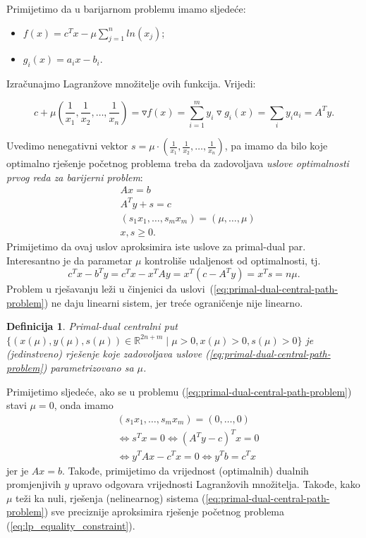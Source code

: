 \documentclass[a4paper, utf8, 11pt, colorlinks]{book}
\newtheorem{definition}{Definicija}
\begin{document}
Primijetimo da u barijarnom problemu imamo sljedeće:
\begin{itemize}
	\item $f(x) =   c^T x - \mu \sum_{j=1}^n ln(x_j) $;
	\item $g_i(x) = a_i x - b_i$.
\end{itemize}
Izračunajmo Lagranžove množitelje ovih funkcija. Vrijedi:

$$c + \mu \left(\frac{1}{x_1}, \frac{1}{x_2}, \ldots, \frac{1}{x_n} \right) = \triangledown f (x) =\sum_{i=1}^m y_i \triangledown g_i(x) = \sum_{i} y_i a_i = A^T y.$$ 

Uvedimo nenegativni vektor $s =\mu \cdot \left(\frac{1}{x_1}, \frac{1}{x_2}, \ldots, \frac{1}{x_n}\right)$, pa imamo da bilo koje optimalno rješenje početnog problema treba da zadovoljava \emph{uslove optimalnosti prvog reda za barijerni problem}:
\begin{align}
	&A x = b \nonumber \\
	&A^T y + s = c  \nonumber \\
	& (s_1 x_1, \ldots, s_m x_m) = (\mu, \ldots, \mu) \label{eq:primal-dual-central-path-problem} \\
	& x, s \geq 0. \nonumber
\end{align}
Primijetimo da ovaj uslov aproksimira iste uslove za primal-dual par.  
Interesantno je da parametar $\mu$ kontroliše udaljenost od optimalnosti, tj. 
$$ c^T x - b^T y = c^T x - x^T A y = x^T(c- A^Ty ) = x^T s = n \mu.$$
 Problem u rješavanju leži u činjenici da uslovi~(\ref{eq:primal-dual-central-path-problem}) ne daju linearni sistem, jer treće ograničenje  nije linearno.

\begin{definition}
	Primal-dual centralni put $\{(x(\mu), y(\mu), s(\mu)) \in \mathbb{R}^{2n + m} \mid \mu > 0, x(\mu) >0, s(\mu)>0 \}$ je (jedinstveno) rješenje koje zadovoljava uslove (\ref{eq:primal-dual-central-path-problem}) parametrizovano sa $\mu$. 
\end{definition}

Primijetimo sljedeće, ako se u problemu (\ref{eq:primal-dual-central-path-problem}) stavi $\mu = 0$, onda imamo 
\begin{align*}
	&(s_1 x_1, \ldots, s_m x_m) = (0, \ldots, 0) \\
	&\Longleftrightarrow s^T x = 0  \Longleftrightarrow (A^T y - c)^T x = 0 \\
	&\Longleftrightarrow y^T A x - c^T x = 0 \Longleftrightarrow y^T b = c^Tx
\end{align*}
jer je $Ax = b$. Takođe, primijetimo da   vrijednost (optimalnih) dualnih promjenjivih $y$ upravo odgovara vrijednosti Lagranžovih množitelja. Takođe, kako $\mu$ teži ka nuli,  rješenja (nelinearnog) sistema  (\ref{eq:primal-dual-central-path-problem})   sve preciznije aproksimira rješenje početnog problema (\ref{eq:lp_equality_constraint}). 
\end{document}
